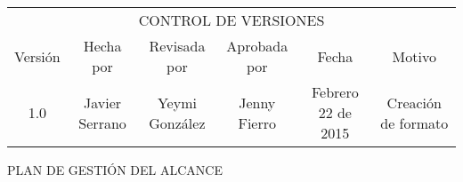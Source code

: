 %
\begin{table}[H]
	\centering
	\begin{tabular}{| c | c | c | c | c | c | }
	\hline
	\multicolumn{6}{c}{CONTROL DE VERSIONES} \\
	\cline{1-6}\noalign{\smallskip}
	\hline
	Versi\'on & Hecha por & Revisada por & Aprobada por & Fecha & Motivo \\ \hline
	 1.0 & Javier Serrano & Yeymi Gonz\'alez & Jenny Fierro & Febrero 22 de 2015 & Creaci\'on de formato \\
	\hline
	\end{tabular}
\end{table}
%
\begin{center}
	\huge{PLAN DE GESTI\'ON DEL ALCANCE}
\end{center}